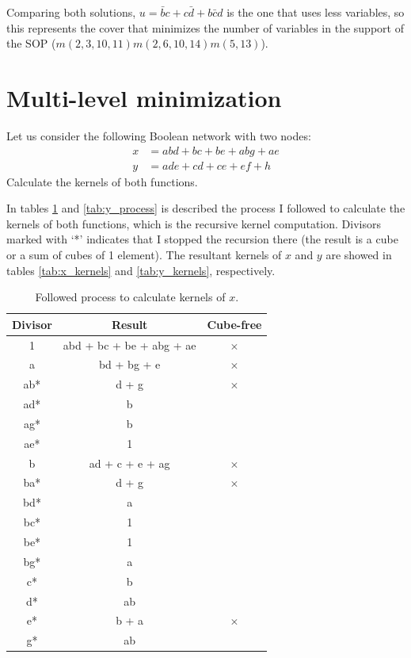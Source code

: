 \documentclass[a4paper, 10pt]{article}
\begin{document}
Comparing both solutions, $u = \bar{b}c + c\bar{d} + b\bar{c}d$ is the one that uses less variables, so this represents the cover that minimizes the number of variables in the support of the SOP ($m(2,3,10,11)m(2,6,10,14)m(5,13)$).

\section{Multi-level minimization}
{\color{statement} 
Let us consider the following Boolean network with two nodes:
\begin{align*}
    x &= abd + bc + be + abg + ae \\
    y &= ade + cd + ce + ef + h
\end{align*}
Calculate the kernels of both functions.}

In tables \ref{tab:x_process} and \ref{tab:y_process} is described the process I followed to calculate the kernels of both functions, which is the recursive kernel computation. Divisors marked with `*' indicates that I stopped the recursion there (the result is a cube or a sum of cubes of 1 element). The resultant kernels of $x$ and $y$ are showed in tables \ref{tab:x_kernels} and \ref{tab:y_kernels}, respectively.


\begin{table}[hbtp]
    \centering
    \begin{tabular}{|c c | c |}
        \hline
        Divisor & Result        & Cube-free \\ \hline
        1       & abd + bc + be + abg + ae & $\times$ \\
        a       &  bd + bg + e  & $\times$ \\
        ab*     & d + g & $\times$ \\
        ad*     & b &  \\
        ag*     & b &  \\
        ae*     & 1 &  \\
        b       & ad + c + e + ag & $\times$ \\
        ba*     & d + g & $\times$ \\
        bd*     & a & \\
        bc*     & 1 & \\
        be*     & 1 & \\
        bg*     & a & \\
        c*       &  b &  \\
        d*       &  ab &  \\
        e*       &  b + a & $\times$ \\
        g*       &  ab & \\
         \hline
    \end{tabular}
    \caption{Followed process to calculate kernels of $x$.}
    \label{tab:x_process}
\end{table}
\end{document}
